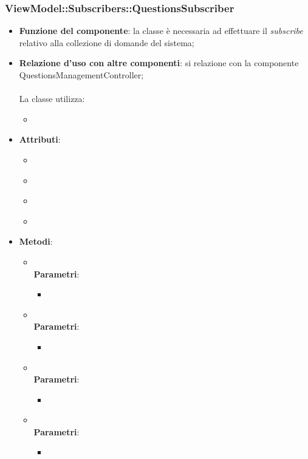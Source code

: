 \subsubsection{ViewModel::Subscribers::QuestionsSubscriber}
\begin{itemize}
\item\textbf{Funzione del componente}: la classe è necessaria ad effettuare il \emph{subscribe} relativo alla collezione di domande del sistema;
	\item\textbf{Relazione d'uso con altre componenti}: si relazione con la componente QuestionsManagementController;\\ \\
La classe utilizza:
	\begin{itemize}
		\item
	\end{itemize}
\item\textbf{Attributi}:
	\begin{itemize}
		\item\code{}\\
		\item\code{}\\
		\item\code{}\\
		\item\code{}\\
	\end{itemize}
\item\textbf{Metodi}:
	\begin{itemize}
		\item\code{}\\
		\textbf{Parametri}:
			\begin{itemize}
				\item\code{}\\
			\end{itemize}
		\item\code{}\\
		\textbf{Parametri}:
			\begin{itemize}
				\item\code{}\\
			\end{itemize}
		\item\code{}\\
		\textbf{Parametri}:
			\begin{itemize}
				\item\code{}\\
			\end{itemize}
		\item\code{}\\
		\textbf{Parametri}:
			\begin{itemize}
				\item\code{}\\
			\end{itemize}
	\end{itemize}
\end{itemize}

